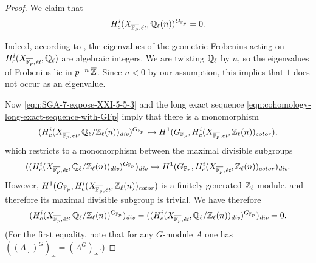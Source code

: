 \documentclass{article}
\numberwithin{equation}{section}
\begin{document}
\begin{proposition}
\begin{proof}
    We claim that
    \begin{equation}
      \label{eqn:SGA-7-expose-XXI-5-5-3}
      H^i_c (X_{\overline{\mathbb{F}_p},\text{\it ét}}, \mathbb{Q}_\ell (n))^{G_{\mathbb{F}_p}} = 0.
    \end{equation}

    Indeed, according to \cite[Exposé~XXI, 5.5.3]{SGA7}, the eigenvalues of the
    geometric Frobenius acting on
    $H^i_c (X_{\overline{\mathbb{F}_p},\text{\it ét}}, \mathbb{Q}_\ell)$ are algebraic
    integers. We are twisting $\mathbb{Q}_\ell$ by $n$, so the eigenvalues of Frobenius
    lie in $p^{-n}\,\overline{\mathbb{Z}}$. Since $n < 0$ by our assumption, this
    implies that $1$ does not occur as an eigenvalue.

    Now \eqref{eqn:SGA-7-expose-XXI-5-5-3} and the long exact sequence
    \eqref{eqn:cohomology-long-exact-sequence-with-GFp} imply that there is a
    monomorphism
    \[ (H^i_c (X_{\overline{\mathbb{F}_p},\text{\it ét}}, \mathbb{Q}_\ell/\mathbb{Z}_\ell (n))_{\text{\it div}})^{G_{\mathbb{F}_p}} \rightarrowtail
    H^1 (G_{\mathbb{F}_p}, H^i_c (X_{\overline{\mathbb{F}_p},\text{\it ét}}, \mathbb{Z}_\ell (n))_{cotor}), \]
    which restricts to a monomorphism between the maximal divisible subgroups
    \[ ((H^i_c (X_{\overline{\mathbb{F}_p},\text{\it ét}}, \mathbb{Q}_\ell/\mathbb{Z}_\ell (n))_{\text{\it div}})^{G_{\mathbb{F}_p}})_{\text{\it div}} \rightarrowtail
    H^1 (G_{\mathbb{F}_p}, H^i_c (X_{\overline{\mathbb{F}_p},\text{\it ét}}, \mathbb{Z}_\ell (n))_{cotor})_{\text{\it div}}. \]
    However,
    $H^1 (G_{\mathbb{F}_p}, H^i_c (X_{\overline{\mathbb{F}_p},\text{\it ét}}, \mathbb{Z}_\ell (n))_{cotor})$
    is a finitely generated $\mathbb{Z}_\ell$-module, and therefore its
    maximal divisible subgroup is trivial. We have therefore
    \[ (H^i_c (X_{\overline{\mathbb{F}_p},\text{\it ét}}, \mathbb{Q}_\ell/\mathbb{Z}_\ell (n))^{G_{\mathbb{F}_p}})_{\text{\it div}} =
    ((H^i_c (X_{\overline{\mathbb{F}_p},\text{\it ét}}, \mathbb{Q}_\ell/\mathbb{Z}_\ell (n))_{\text{\it div}})^{G_{\mathbb{F}_p}})_{\text{\it div}} = 0. \]
    (For the first equality, note that for any $G$-module $A$ one has
    $((A_\div)^G)_\div = (A^G)_\div$.)
  \end{proof}
\end{proposition}
\end{document}
